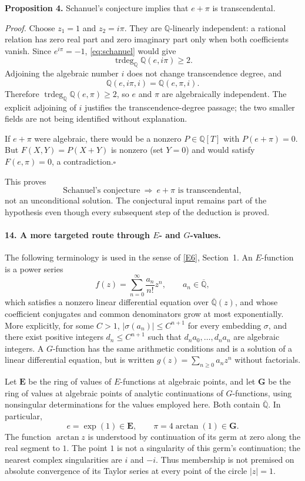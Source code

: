 \documentclass[11pt]{article}
\newcommand{\Q}{\mathbb Q}
\newcommand{\Qbar}{\overline{\mathbb Q}}
\DeclareMathOperator{\trdeg}{trdeg}
\begin{document}
\textbf{Proposition 4.} Schanuel's conjecture implies that $e+\pi$ is
transcendental.

\emph{Proof.} Choose $z_1=1$ and $z_2=i\pi$. They are $\Q$-linearly
independent: a rational relation has zero real part and zero imaginary
part only when both coefficients vanish. Since $e^{i\pi}=-1$,
\eqref{eq:schanuel} would give
\[
 \trdeg_{\Q}\Q(e,i\pi)\ge2.
\]
Adjoining the algebraic number $i$ does not change transcendence degree,
and
\[
 \Q(e,i\pi,i)=\Q(e,\pi,i).
\]
Therefore $\trdeg_{\Q}\Q(e,\pi)\ge2$, so $e$ and $\pi$ are
algebraically independent. The explicit adjoining of $i$ justifies the
transcendence-degree passage; the two smaller fields are not being
identified without explanation.

If $e+\pi$ were algebraic, there would be a nonzero $P\in\Q[T]$ with
$P(e+\pi)=0$. But $F(X,Y)=P(X+Y)$ is nonzero (set $Y=0$) and would satisfy
$F(e,\pi)=0$, a contradiction.\hfill$\square$

This proves
\[
 \boxed{\text{Schanuel's conjecture}\ \Longrightarrow\
        e+\pi\text{ is transcendental},}
\]
not an unconditional solution. The conjectural input remains part of the
hypothesis even though every subsequent step of the deduction is proved.

\paragraph{14. A more targeted route through $E$- and $G$-values.}
The following terminology is used in the sense of
\href{https://arxiv.org/html/2301.13518v1}{[E6]}, Section~1.
An $E$-function is a power series
\[
 f(z)=\sum_{n=0}^{\infty}\frac{a_n}{n!}z^n,\qquad a_n\in\Qbar,
\]
which satisfies a nonzero linear differential equation over $\Qbar(z)$,
and whose coefficient conjugates and common denominators grow at most
exponentially. More explicitly, for some $C>1$,
$|\sigma(a_n)|\le C^{n+1}$ for every embedding $\sigma$, and there exist
positive integers $d_n\le C^{n+1}$ such that $d_na_0,\ldots,d_na_n$ are
algebraic integers. A $G$-function has the same arithmetic conditions and
is a solution of a linear differential equation, but is written
$g(z)=\sum_{n\ge0}a_nz^n$ without factorials.

Let $\mathbf E$ be the ring of values of $E$-functions at algebraic points,
and let $\mathbf G$ be the ring of values at algebraic points of analytic
continuations of $G$-functions, using nonsingular determinations for the
values employed here. Both contain $\Qbar$. In particular,
\begin{equation}\label{eq:E-G-membership}
 e=\exp(1)\in\mathbf E,\qquad
 \pi=4\arctan(1)\in\mathbf G.
\end{equation}
The function $\arctan z$ is understood by continuation of its germ at zero
along the real segment to $1$. The point $1$ is not a singularity of this
germ's continuation; the nearest complex singularities are $i$ and $-i$.
Thus membership is not premised on absolute convergence of its Taylor
series at every point of the circle $|z|=1$.
\end{document}
